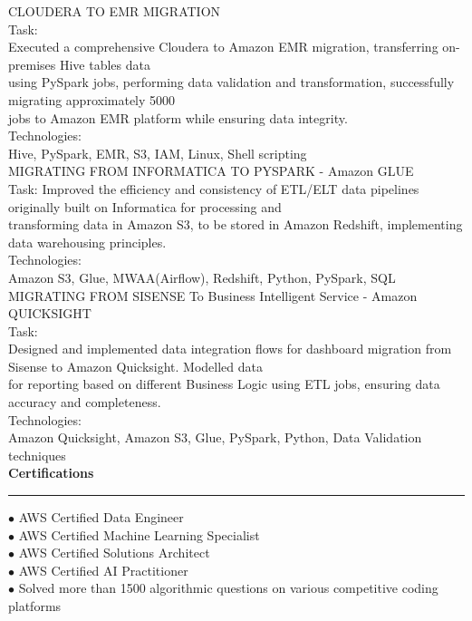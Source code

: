 \documentclass[11pt,a4paper]{article}
\renewcommand{\section}[1]{%
  \vspace{12pt}%
  {\large\bfseries #1}%
  \vspace{6pt}%
  \hrule%
  \vspace{6pt}%
}
\begin{document}
CLOUDERA TO EMR MIGRATION\\[0.2cm]
Task:\\[0.2cm]
Executed a comprehensive Cloudera to Amazon EMR migration, transferring on-premises Hive tables data\\[0.2cm]
using PySpark jobs, performing data validation and transformation, successfully migrating approximately 5000\\[0.2cm]
jobs to Amazon EMR platform while ensuring data integrity.\\[0.2cm]
Technologies:\\[0.2cm]
Hive, PySpark, EMR, S3, IAM, Linux, Shell scripting\\[0.2cm]
MIGRATING FROM INFORMATICA TO PYSPARK - Amazon GLUE\\[0.2cm]
Task: Improved the efficiency and consistency of ETL/ELT data pipelines originally built on Informatica for processing and\\[0.2cm]
transforming data in Amazon S3, to be stored in Amazon Redshift, implementing data warehousing principles.\\[0.2cm]
Technologies:\\[0.2cm]
Amazon S3, Glue, MWAA(Airflow), Redshift, Python, PySpark, SQL\\[0.2cm]
MIGRATING FROM SISENSE To Business Intelligent Service - Amazon QUICKSIGHT\\[0.2cm]
Task:\\[0.2cm]
Designed and implemented data integration flows for dashboard migration from Sisense to Amazon Quicksight. Modelled data\\[0.2cm]
for reporting based on different Business Logic using ETL jobs, ensuring data accuracy and completeness.\\[0.2cm]
Technologies:\\[0.2cm]
Amazon Quicksight, Amazon S3, Glue, PySpark, Python, Data Validation techniques\\[0.2cm]
\section{Certifications}

\noindent $\bullet$ AWS Certified Data Engineer\\[0.2cm]
\noindent $\bullet$ AWS Certified Machine Learning Specialist\\[0.2cm]
\noindent $\bullet$ AWS Certified Solutions Architect\\[0.2cm]
\noindent $\bullet$ AWS Certified AI Practitioner\\[0.2cm]
\noindent $\bullet$ Solved more than 1500 algorithmic questions on various competitive coding platforms\\[0.2cm]
\end{document}
